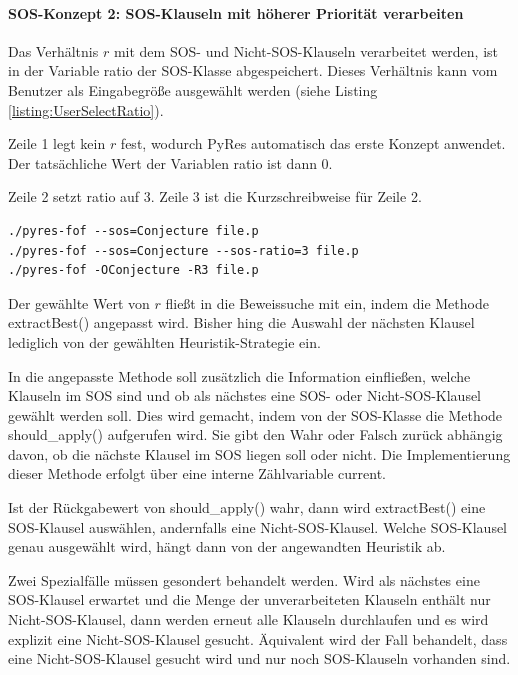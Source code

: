 \paragraph{SOS-Konzept 2: SOS-Klauseln mit höherer Priorität verarbeiten}

Das Verhältnis $r$ mit dem SOS- und Nicht-SOS-Klauseln verarbeitet werden, ist in der Variable ratio der SOS-Klasse abgespeichert. Dieses Verhältnis kann vom Benutzer als Eingabegröße ausgewählt werden (siehe Listing \ref{listing:UserSelectRatio}). 

Zeile 1 legt kein $r$ fest, wodurch PyRes automatisch das erste Konzept anwendet. Der tatsächliche Wert der Variablen ratio ist dann 0. 

Zeile 2 setzt ratio auf 3. Zeile 3 ist die Kurzschreibweise für Zeile 2.

\begin{lstlisting}[label={listing:UserSelectRatio}, caption={Befehle zum Aufrufen von PyRes}]
./pyres-fof --sos=Conjecture file.p
./pyres-fof --sos=Conjecture --sos-ratio=3 file.p
./pyres-fof -OConjecture -R3 file.p
\end{lstlisting}

Der gewählte Wert von $r$ fließt in die Beweissuche mit ein, indem die Methode extractBest() angepasst wird. Bisher hing die Auswahl der nächsten Klausel lediglich von der gewählten Heuristik-Strategie ein.

In die angepasste Methode soll zusätzlich die Information einfließen, welche Klauseln im SOS sind und ob als nächstes eine SOS- oder Nicht-SOS-Klausel gewählt werden soll. Dies wird gemacht, indem von der SOS-Klasse die Methode should\_apply() aufgerufen wird. Sie gibt den Wahr oder Falsch zurück abhängig davon, ob die nächste Klausel im SOS liegen soll oder nicht. Die Implementierung dieser Methode erfolgt über eine interne Zählvariable current.

Ist der Rückgabewert von should\_apply() wahr, dann wird extractBest() eine SOS-Klausel auswählen, andernfalls eine Nicht-SOS-Klausel. Welche SOS-Klausel genau ausgewählt wird, hängt dann von der angewandten Heuristik ab.

Zwei Spezialfälle müssen gesondert behandelt werden. Wird als nächstes eine SOS-Klausel erwartet und die Menge der unverarbeiteten Klauseln enthält nur Nicht-SOS-Klausel, dann werden erneut alle Klauseln durchlaufen und es wird explizit eine Nicht-SOS-Klausel gesucht. Äquivalent wird der Fall behandelt, dass eine Nicht-SOS-Klausel gesucht wird und nur noch SOS-Klauseln vorhanden sind.

